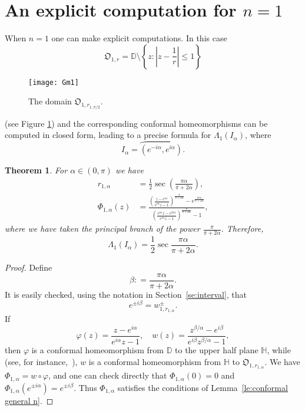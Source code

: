 \documentclass[11pt,reqno]{amsart}
\numberwithin{equation}{section}
\theoremstyle{plain}
\newtheorem{Theorem}[equation]{Theorem}
\theoremstyle{definition}
\begin{document}
\section{An explicit computation for $n=1$}

When  $n=1$ one can make explicit computations. In this case 
$${\mathfrak{O}}_{1,r}= { \mathbb{D}} \setminus \left \{z: \left|z- \frac{1}{r}\right| \le1\right\}$$ 
\begin{figure}
		\begin{center}
			\texttt{[image: Gm1]}
		\end{center}
		\caption{\footnotesize The domain ${\mathfrak{O}}_{1, r_{1, \pi/2}}$.}
				\label{FigureGm1}
	\end{figure}
(see Figure \ref{FigureGm1}) and the corresponding conformal homeomorphisms can be computed in closed form, leading to a precise formula for $\Lambda_1(I_{\alpha})$, where 
$$I_{\alpha} = \wideparen{(e^{-i\alpha}, e^{i\alpha})}.$$

\begin{Theorem}\label{th:formula for lambda_1}
For $\alpha \in (0, \pi)$ we have 
\begin{equation*}
 \begin{split}
  r_{1,\alpha}&=\frac{1}{2}\sec\left(\frac{\pi\alpha}{\pi+2\alpha}\right),\\  
  \Phi_{1,\alpha}(z)& =
  \frac{\left( \frac{z-e^{i\alpha}}{e^{i\alpha}z-1} \right)^\frac{\pi}{\pi+2\alpha}
-e^\frac{i\pi\alpha}{\pi+2\alpha}  }{\left( \frac{e^{i\alpha}z-e^{2i\alpha}}{e^{i\alpha}z-1} \right)^\frac{\pi}{\pi+2\alpha}-1 },
   \end{split}
\end{equation*}
where we have taken the principal branch of the power $\frac{\pi}{\pi+2\alpha}$.
Therefore, 
\begin{equation}
\label{eq:lambda for n=1}
\Lambda_1(I_{\alpha})=\frac{1}{2} \sec\frac{\pi\alpha}{\pi+2\alpha}.
\end{equation}
\end{Theorem}
 
\begin{proof}
Define $$\beta : =\frac{\pi\alpha}{\pi+2\alpha}.$$
It is easily checked, using the notation in Section~\ref{se:interval}, that $$e^{\pm i\beta}=w^\pm_{1,r_{1,\alpha}}.$$ If
\[
{\varphi}(z)=\frac{z-e^{i\alpha}}{e^{i\alpha}z-1},  \quad
w(z)=\frac{z^{\beta/\alpha}-e^{i\beta}}{e^{i\beta}z^{\beta/\alpha}-1},
\]
then ${\varphi}$ is a conformal homeomorphism from ${\mathbb{D}}$ to the upper half plane ${\mathbb{H}}$, while (see, for instance,~\cite[page 48]{Kob}), $w$ is a conformal homeomorphism from ${\mathbb{H}}$ to ${\mathfrak{O}}_{1,r_{1,\alpha}}$.
 We have $\Phi_{1,\alpha}=w\circ {\varphi}$, and one can check directly that $\Phi_{1,\alpha}(0)=0$ and $\Phi_{1,\alpha}(e^{\pm i\alpha})=e^{\pm i\beta}$. Thus $\Phi_{1,\alpha}$ satisfies the conditions of Lemma~\ref{le:conformal general n}.
\end{proof}
 
\end{document}
